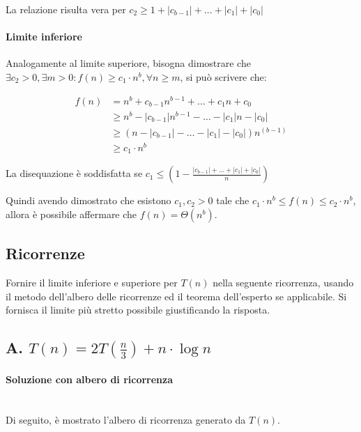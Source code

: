 \documentclass{article}
\begin{document}
La relazione risulta vera per $c_2 \geq 1+|c_{b-1}|+\ldots+|c_1|+|c_0| $

\paragraph{Limite inferiore} Analogamente al limite superiore, bisogna dimostrare che $\exists c_2 > 0, \exists m > 0: f(n) \geq c_1\cdot n^b, \forall n \geq m$, si può scrivere che:

\begin{align*}
    f(n)&= n^b+c_{b-1}n^{b-1}+\ldots+c_1n+c_0\\
    &\geq n^b-|c_{b-1}|n^{b-1}-\ldots-|c_1|n-|c_0|\\
    &\geq (n-|c_{b-1}|-\ldots-|c_1|-|c_0|)n^{(b-1)}\\
    &\geq c_1\cdot n^b
\end{align*}

La disequazione è soddisfatta se $c_1 \leq (1 - \frac{|c_{b-1}|+\ldots+|c_1|+|c_0|}{n}) $

Quindi avendo dimostrato che esistono $c_1,c_2 > 0$ tale che $c_1\cdot n^b\leq f(n) \leq c_2 \cdot n^b$, allora è possibile affermare che $f(n) = \Theta(n^b)$.

\clearpage
\subsection{Ricorrenze}
Fornire il limite inferiore e superiore per $T(n)$ nella seguente ricorrenza, usando il metodo dell’albero delle ricorrenze ed il teorema dell’esperto se applicabile. Si fornisca il limite più stretto possibile giustificando la risposta.

\subsection*{A. $T(n) = 2T(\frac{n}{3})+n\cdot \log n$}
\paragraph{Soluzione con albero di ricorrenza}\mbox{}\\

Di seguito, è mostrato l'albero di ricorrenza generato da $T(n)$.
\end{document}
